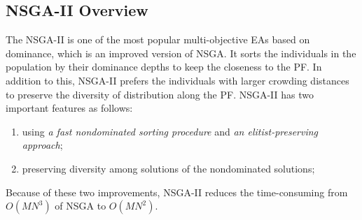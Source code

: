 \documentclass[a4paper, 11pt]{article}
\begin{document}
\subsection{NSGA-II Overview}
The NSGA-II is one of the most popular multi-objective EAs based on dominance, which is an improved version of NSGA\cite{}.
It sorts the individuals in the population by their dominance depths to keep the closeness to the PF.
In addition to this, NSGA-II prefers the individuals with larger crowding distances to preserve the diversity of distribution
along the PF. NSGA-II has two important features as follows:
\begin{enumerate}[1)]
\item using \emph{a fast nondominated sorting procedure} and \emph{an elitist-preserving approach};
\item preserving diversity among solutions of the nondominated solutions;
\end{enumerate}
Because of these two improvements, NSGA-II reduces the time-consuming from $O(MN^3)$ of NSGA to $O(MN^2)$.
\end{document}
